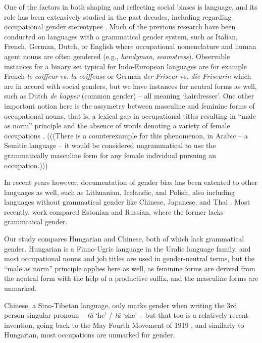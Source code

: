 \documentclass[11pt]{article}
\newcommand{\zh}[1]{\simplifiedchinesefont{#1}\rmfamily}
\begin{document}
One of the factors in both shaping and reflecting social biases is language, and its role has been extensively studied in the past decades, including regarding occupational gender stereotypes \citep[cf.][]{sabatini_1985_occupational,pauwels_1997_handymen,gygax_2008_generically,lewis_2020_gender,kaukonen_2025_gender}. Much of the previous research have been conducted on languages with a grammatical gender system, such as Italian, French, German, Dutch, or English where occupational nomenclature and human agent nouns are often gendered (e.g., \textit{handyman}, \textit{seamstress}). 
Observable instances for a binary set typical for Indo-European languages are for example French \textit{le coiffeur} vs. \textit{la coiffeuse} or German \textit{der Friseur} vs. \textit{die Friseurin} which are in accord with social genders, but we have instances for neutral forms as well, such as Dutch \textit{de kapper} (common gender) -- all meaning `hairdresser'. One other important notion here is the assymetry between masculine and feminine forms of occupational nouns, that is, a lexical gap in occupational titles resulting in ``male as norm'' principle and the absence of words denoting a variety of female occupations \citep{baron_1986_grammar,hellinger_1990_kontrastive,sabatini_1985_occupational,yaguello_1978_mots,pauwels_2003_linguistic}. (((There is a counterexample for this phenomenon, in Arabic -- a Semitic language -- it would be considered ungrammatical to use the grammatically masculine form for any female individual pursuing an occupation.)))

In recent years however, documentation of gender bias has been extented to other languages as well, such as Lithuanian, Icelandic, and Polish, also including languages without grammatical gender like Chinese, Japanese, and Thai \citep[see][]{hellinger_2003_gender,pauwels_1998_women,pauwels_2003_linguistic}. Most recently,  work compared Estonian and Russian, where the former lacks grammatical gender.

Our study compares Hungarian and Chinese, both of which lack grammatical gender. Hungarian is a Finno-Ugric language in the Uralic language family, and most occupational nouns and job titles are used in gender-neutral terms, but the ``male as norm'' principle applies here as well, as feminine forms are derived from the neutral form with the help of a productive suffix, and the masculine forms are unmarked.

Chinese, a Sino-Tibetan language, only marks gender when writing the 3rd person singular pronoun -- \zh{他} \textit{tā} `he' / \zh{她} \textit{tā} `she' -- but that too is a relatively recent invention, going back to the May Fourth Movement of 1919 \citep{bi_2013_tazi}, and similarly to Hungarian, most occupations are unmarked for gender.
\end{document}
